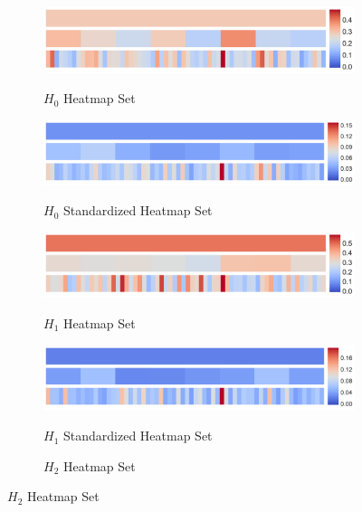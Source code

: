 \documentclass[12pt]{article}
\begin{document}
\begin{figure}[htp!]
  \centering
  \begin{subfigure}{.45\textwidth}
    \centering
    \caption{$H_0$ Heatmap Set}
    \includegraphics[width=\linewidth]{fig_12_hmap_dim0_nonorm.pdf}
    \label{fig:cubeHeatmap0}
  \end{subfigure}
  \begin{subfigure}{.45\textwidth}
    \centering
    \caption{$H_0$ Standardized Heatmap Set}
    \includegraphics[width=\linewidth]{fig_12_hmap_dim0_yesnorm.pdf}
    \label{fig:cubeHeatmapStand0}
  \end{subfigure}
  \begin{subfigure}{.45\textwidth}
    \centering
    \caption{$H_1$ Heatmap Set}
    \includegraphics[width=\linewidth]{fig_12_hmap_dim1_nonorm.pdf}
    \label{fig:cubeHeatmap1}
  \end{subfigure}
  \begin{subfigure}{.45\textwidth}
    \centering
    \caption{$H_1$ Standardized Heatmap Set}
    \includegraphics[width=\linewidth]{fig_12_hmap_dim1_yesnorm.pdf}
    \label{fig:cubeHeatmapStand1}
  \end{subfigure}
  \begin{subfigure}{.45\textwidth}
    \centering
    \caption{$H_2$ Heatmap Set}

\end{subfigure}
\end{figure}
\end{document}

